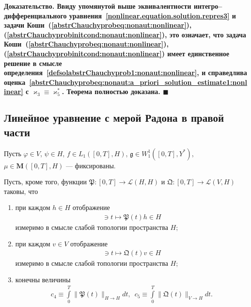 \documentclass{report}
\newcounter{lem}[section]
\newenvironment{Proof}{\par\noindent\bf Доказательство.\rm}{ $\blacksquare$\par}
\begin{document}
\begin{Proof}
Ввиду упомянутой выше эквивалентности интегро--дифференциального уравнения~\ref{nonlinear.equation.solution.repres3} и задачи Коши~(\ref{abstrChauchyprobeq:nonaut:nonlinear}), (\ref{abstrChauchyprobinitcond:nonaut:nonlinear}), это означает, что задача Коши~(\ref{abstrChauchyprobeq:nonaut:nonlinear}), (\ref{abstrChauchyprobinitcond:nonaut:nonlinear}) имеет единственное решение в смысле определения~\ref{defsolabstrChauchyprob1:nonaut:nonlinear}, и справедлива оценка~\eqref{abstrChauchyprobeq:nonaut:a_priori_solution_estimate1:nonlinear} с $\varkappa_3\equiv\varkappa_5^*$. Теорема полностью доказана.
\end{Proof}

	    \subsection{Линейное уравнение с мерой Радона в правой части}\label{sec:linear_with_measure:problem}
Пусть $\varphi\in V$, $\psi\in H$, $f\in L_1([0,T],H)$, $\mathfrak{g}\in W^1_1([0,T], Y^*)$, $\mu\in\mathbf{M}([0,T],H)$ --- фиксированы.

Пусть, кроме того, функции $\mathfrak{P}:[0,T]\to\mathcal{L}(H,H)$ и $\mathfrak{Q}:[0,T]\to\mathcal{L}(V,H)$ таковы, что
\begin{enumerate}
\item при каждом $h\in H$ отображение 
\begin{gather*}
[0,T]\ni t\mapsto\mathfrak{P}(t)h\in H
\end{gather*}
измеримо в смысле слабой топологии пространства $H$;

\item при каждом $v\in V$ отображение 
\begin{gather*}
[0,T]\ni t\mapsto\mathfrak{Q}(t)v\in H
\end{gather*}
измеримо в смысле слабой топологии пространства $H$;

\item конечны величины
\begin{gather*}
c_4\equiv\int\limits_0^T\|\mathfrak{P}(t)\|_{H\to H}dt,\,\,\,c_5\equiv\int\limits_0^T\|\mathfrak{Q}(t)\|_{V\to H}dt.
\end{gather*}
\end{enumerate}
\end{document}

